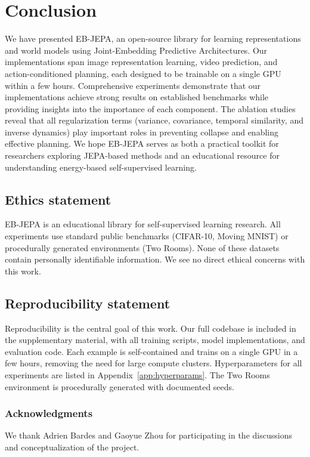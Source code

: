 \documentclass{article}
\begin{document}
\section{Conclusion}

We have presented EB-JEPA, an open-source library for learning representations and world models using Joint-Embedding Predictive Architectures.
Our implementations span image representation learning, video prediction, and action-conditioned planning, each designed to be trainable on a single GPU within a few hours.
Comprehensive experiments demonstrate that our implementations achieve strong results on established benchmarks while providing insights into the importance of each component.
The ablation studies reveal that all regularization terms (variance, covariance, temporal similarity, and inverse dynamics) play important roles in preventing collapse and enabling effective planning.
We hope EB-JEPA serves as both a practical toolkit for researchers exploring JEPA-based methods and an educational resource for understanding energy-based self-supervised learning.


\newpage


\subsection*{Ethics statement}

EB-JEPA is an educational library for self-supervised learning research. All experiments use standard public benchmarks (CIFAR-10, Moving MNIST) or procedurally generated environments (Two Rooms). None of these datasets contain personally identifiable information. We see no direct ethical concerns with this work.

\subsection*{Reproducibility statement}

Reproducibility is the central goal of this work. Our full codebase is included in the supplementary material, with all training scripts, model implementations, and evaluation code. Each example is self-contained and trains on a single GPU in a few hours, removing the need for large compute clusters. Hyperparameters for all experiments are listed in Appendix~\ref{app:hyperparams}. The Two Rooms environment is procedurally generated with documented seeds.

\ificlrfinal
\subsubsection*{Acknowledgments}
We thank Adrien Bardes and Gaoyue Zhou for participating in the discussions and conceptualization of the project.
\fi
\end{document}
